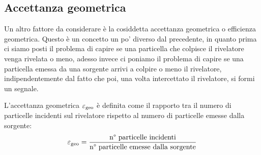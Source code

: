 \subsection{Accettanza geometrica}
Un altro fattore da considerare è la cosiddetta accettanza geometrica o efficienza geometrica. Questo è un concetto un po' diverso dal precedente, in quanto prima ci siamo posti il problema di capire se una particella che colpisce il rivelatore venga rivelata o meno, adesso invece ci poniamo il problema di capire se una particella emessa da una sorgente arrivi a colpire o meno il rivelatore, indipendentemente dal fatto che poi, una volta intercettato il rivelatore, si formi un segnale.

L'accettanza geometrica $\varepsilon_{\rm geo}$ è definita come il rapporto tra il numero di particelle incidenti sul rivelatore rispetto al numero di particelle emesse dalla sorgente:
\begin{equation*}
   \varepsilon_{\rm geo}
   =\frac{\text{n° particelle incidenti}}{\text{n° particelle emesse dalla sorgente}}
\end{equation*}
